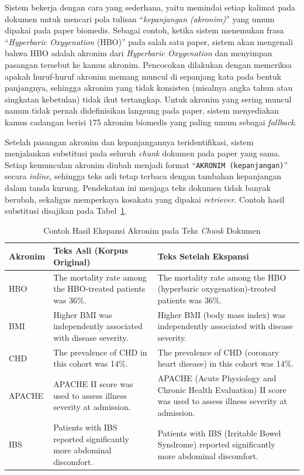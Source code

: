 Sistem bekerja dengan cara yang sederhana, yaitu memindai setiap kalimat pada dokumen untuk mencari pola tulisan ``\textit{kepanjangan (akronim)}'' yang umum dipakai pada paper biomedis. Sebagai contoh, ketika sistem menemukan frasa ``\textit{Hyperbaric Oxygenation} (HBO)'' pada salah satu paper, sistem akan mengenali bahwa HBO adalah akronim dari \textit{Hyperbaric Oxygenation} dan menyimpan pasangan tersebut ke kamus akronim. Pencocokan dilakukan dengan memeriksa apakah huruf-huruf akronim memang muncul di sepanjang kata pada bentuk panjangnya, sehingga akronim yang tidak konsisten (misalnya angka tahun atau singkatan kebetulan) tidak ikut tertangkap. Untuk akronim yang sering muncul namun tidak pernah didefinisikan langsung pada paper, sistem menyediakan kamus cadangan berisi 175 akronim biomedis yang paling umum sebagai \textit{fallback}.

Setelah pasangan akronim dan kepanjangannya teridentifikasi, sistem menjalankan substitusi pada seluruh \textit{chunk} dokumen pada paper yang sama. Setiap kemunculan akronim diubah menjadi format ``\texttt{AKRONIM (kepanjangan)}'' secara \textit{inline}, sehingga teks asli tetap terbaca dengan tambahan kepanjangan dalam tanda kurung. Pendekatan ini menjaga teks dokumen tidak banyak berubah, sekaligus memperkaya kosakata yang dipakai \textit{retriever}. Contoh hasil substitusi disajikan pada Tabel~\ref{tbl:ekspansi-contoh}.

\begin{table}[H]
\centering
\footnotesize
\setlength{\tabcolsep}{3pt}
\caption{Contoh Hasil Ekspansi Akronim pada Teks \textit{Chunk} Dokumen}
\label{tbl:ekspansi-contoh}
\begin{tabular}{p{1.2cm} p{5.1cm} p{6.3cm}}
\toprule
\textbf{Akronim} & \textbf{Teks Asli (Korpus Original)} & \textbf{Teks Setelah Ekspansi} \\
\midrule
HBO    & The mortality rate among the HBO-treated patients was 36\%. & The mortality rate among the HBO (hyperbaric oxygenation)-treated patients was 36\%. \\
\addlinespace
BMI    & Higher BMI was independently associated with disease severity. & Higher BMI (body mass index) was independently associated with disease severity. \\
\addlinespace
CHD    & The prevalence of CHD in this cohort was 14\%. & The prevalence of CHD (coronary heart disease) in this cohort was 14\%. \\
\addlinespace
APACHE & APACHE II score was used to assess illness severity at admission. & APACHE (Acute Physiology and Chronic Health Evaluation) II score was used to assess illness severity at admission. \\
\addlinespace
IBS    & Patients with IBS reported significantly more abdominal discomfort. & Patients with IBS (Irritable Bowel Syndrome) reported significantly more abdominal discomfort. \\
\bottomrule
\end{tabular}
\end{table}

